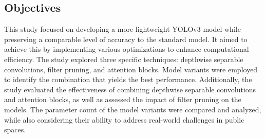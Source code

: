 \subsection{Objectives}

This study focused on developing a more lightweight YOLOv3 model while preserving a comparable level of accuracy to the standard model. It aimed to achieve this by implementing various optimizations to enhance computational efficiency. The study explored three specific techniques: depthwise separable convolutions, filter pruning, and attention blocks. Model variants were employed to identify the combination that yields the best performance. Additionally, the study evaluated the effectiveness of combining depthwise separable convolutions and attention blocks, as well as assessed the impact of filter pruning on the models. The parameter count of the model variants were compared and analyzed, while also considering their ability to address real-world challenges in public spaces.
